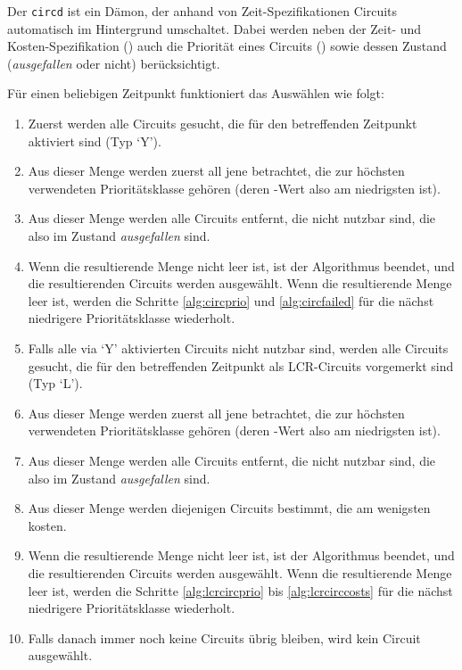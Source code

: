 
Der \texttt{circd} ist ein Dämon, der anhand von Zeit-Spezifikationen Circuits
automatisch im Hintergrund umschaltet. Dabei werden neben der Zeit- und
Kosten-Spezifikation () auch die Priorität eines Circuits
() sowie dessen Zustand (\emph{ausgefallen} oder
nicht) berücksichtigt.

Für einen beliebigen Zeitpunkt funktioniert das Auswählen wie folgt:

\begin{enumerate}
\item Zuerst werden alle Circuits gesucht, die für den betreffenden Zeitpunkt
aktiviert sind (Typ `Y').
\item\label{alg:circprio} Aus dieser Menge werden zuerst all jene betrachtet,
die zur höchsten verwendeten Prioritätsklasse gehören (deren
-Wert also am niedrigsten ist).
\item\label{alg:circfailed} Aus dieser Menge werden alle Circuits entfernt, die
nicht nutzbar sind, die also im Zustand \emph{ausgefallen} sind.
\item Wenn die resultierende Menge nicht leer ist, ist der
Algorithmus beendet, und die resultierenden Circuits werden ausgewählt. Wenn
die resultierende Menge leer ist, werden die Schritte \ref{alg:circprio} und
\ref{alg:circfailed} für die nächst niedrigere Prioritätsklasse wiederholt.
\item Falls alle via `Y' aktivierten Circuits nicht nutzbar sind, werden alle
Circuits gesucht, die für den betreffenden Zeitpunkt als LCR-Circuits
vorgemerkt sind (Typ `L').
\item\label{alg:lcrcircprio} Aus dieser Menge werden zuerst all jene betrachtet,
die zur höchsten verwendeten Prioritätsklasse gehören (deren
-Wert also am niedrigsten ist).
\item\label{alg:lcrcircfailed} Aus dieser Menge werden alle Circuits entfernt,
die nicht nutzbar sind, die also im Zustand \emph{ausgefallen} sind.
\item\label{alg:lcrcirccosts} Aus dieser Menge werden diejenigen Circuits
bestimmt, die am wenigsten kosten.
\item Wenn die resultierende Menge nicht leer ist, ist der Algorithmus beendet,
und die resultierenden Circuits werden ausgewählt. Wenn die resultierende Menge
leer ist, werden die Schritte \ref{alg:lcrcircprio} bis \ref{alg:lcrcirccosts}
für die nächst niedrigere Prioritätsklasse wiederholt.
\item Falls danach immer noch keine Circuits übrig bleiben, wird kein Circuit
ausgewählt.
\end{enumerate}

